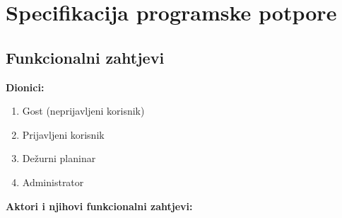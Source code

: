 %
%
%
%
%
\chapter{Specifikacija programske potpore}

\section{Funkcionalni zahtjevi}
\textbf{Dionici:}
\begin{enumerate}
\item Gost (neprijavljeni korisnik)
\item Prijavljeni korisnik
\item Dežurni planinar
\item Administrator
\end{enumerate}
\noindent
\textbf{Aktori i njihovi funkcionalni zahtjevi:}

